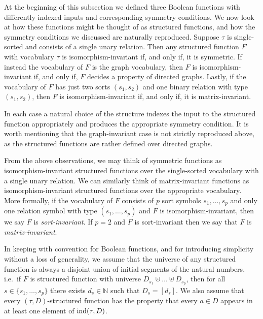 \documentclass[../paper.tex]{subfiles}
\begin{document}
At the beginning of this subsection we defined three Boolean functions with
differently indexed inputs and corresponding symmetry conditions. We now look at
how these functions might be thought of as structured functions, and how the
symmetry conditions we discussed are naturally reproduced. Suppose $\tau$ is
single-sorted and consists of a single unary relation. Then any structured
function $F$ with vocabulary $\tau$ is isomorphism-invariant if, and only if, it
is symmetric. If instead the vocabulary of $F$ is the graph vocabulary, then $F$
is isomorphism-invariant if, and only if, $F$ decides a property of directed
graphs. Lastly, if the vocabulary of $F$ has just two sorts $(s_1, s_2)$ and one
binary relation with type $(s_1, s_2)$, then $F$ is isomorphism-invariant if,
and only if, it is matrix-invariant.

In each case a natural choice of the structure indexes the input to the
structured function appropriately and produces the appropriate symmetry
condition. It is worth mentioning that the graph-invariant case is not strictly
reproduced above, as the structured functions are rather defined over directed
graphs.

From the above observations, we may think of symmetric functions as
isomorphism-invariant structured functions over the single-sorted vocabulary
with a single unary relation. We can similarly think of matrix-invariant
functions as isomorphism-invariant structured functions over the appropriate
vocabulary. More formally, if the vocabulary of $F$ consists of $p$ sort symbols
$s_1, \ldots , s_p$ and only one relation symbol with type $(s_1, \ldots, s_p)$
and $F$ is isomorphism-invariant, then we say $F$ is \emph{sort-invariant}. If
$p = 2$ and $F$ is sort-invariant then we say that $F$ is
\emph{matrix-invariant}.

In keeping with convention for Boolean functions, and for introducing simplicity
without a loss of generality, we assume that the universe of any structured
function is always a disjoint union of initial segments of the natural numbers,
i.e.\ if $F$ is structured function with universe $D_{s_1} \uplus \ldots \uplus
D_{s_p}$, then for all $s \in \{s_1 , \ldots , s_p\}$ there exists $d_s \in
\mathbb{N}$ such that $D_{s} = [d_s]$. We also assume that every $(\tau,
D)$-structured function has the property that every $a \in D$ appears in at
least one element of $\text{\upshape ind}(\tau, D)$.


\end{document}
